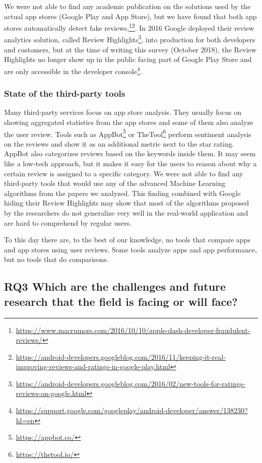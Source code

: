 \documentclass[]{book}
\let\rmarkdownfootnote\footnote%
\def\footnote{\protect\rmarkdownfootnote}
\begin{document}
We were not able to find any academic publication on the solutions used
by the actual app stores (Google Play and App Store), but we have found
that both app stores automatically detect fake reviews,\footnote{\url{https://www.macrumors.com/2016/10/10/apple-dash-developer-fraudulent-reviews/}}\footnote{\url{https://android-developers.googleblog.com/2016/11/keeping-it-real-improving-reviews-and-ratings-in-google-play.html}}.
In 2016 Google deployed their review analytics solution, called Review
Highlights\footnote{\url{https://android-developers.googleblog.com/2016/02/new-tools-for-ratings-reviews-on-google.html}},
into production for both developers and customers, but at the time of
writing this survey (October 2018), the Review Highlights no longer show
up in the public facing part of Google Play Store and are only
accessible in the developer console\footnote{\url{https://support.google.com/googleplay/android-developer/answer/138230?hl=en}}.

\subsubsection{State of the third-party
tools}\label{state-of-the-third-party-tools}

Many third-party services focus on app store analysis. They usually
focus on showing aggregated statistics from the app stores and some of
them also analyze the user review. Tools such as AppBot\footnote{\url{https://appbot.co/}}
or TheTool\footnote{\url{https://thetool.io/}} perform sentiment
analysis on the reviews and show it as an additional metric next to the
star rating. AppBot also categorizes reviews based on the keywords
inside them. It may seem like a low-tech approach, but it makes it easy
for the users to reason about why a certain review is assigned to a
specific category. We were not able to find any third-party tools that
would use any of the advanced Machine Learning algorithms from the
papers we analyzed. This finding combined with Google hiding their
Review Highlights may show that most of the algorithms proposed by the
researchers do not generalize very well in the real-world application
and are hard to comprehend by regular users.

To this day there are, to the best of our knowledge, no tools that
compare apps and app stores using user reviews. Some tools analyze apps
and app performance, but no tools that do comparisons.

\subsection{\texorpdfstring{\textbf{RQ3} Which are the challenges and
future research that the field is facing or will
face?}{RQ3 Which are the challenges and future research that the field is facing or will face?}}\label{rq3-which-are-the-challenges-and-future-research-that-the-field-is-facing-or-will-face}
\end{document}
